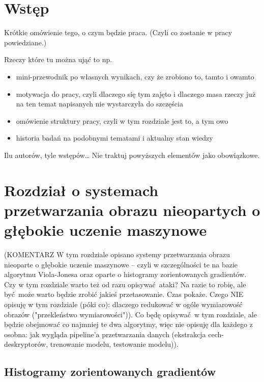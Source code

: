 \documentclass[12pt,a4paper,leqno,oneside,titlepage]{book}
\begin{document}
\mainmatter

\chapter*{Wstęp}

Krótkie omówienie tego, o czym będzie praca. (Czyli co zostanie w pracy powiedziane.)

Rzeczy które tu można ująć to np. 
\begin{itemize}
\item mini-przewodnik po własnych wynikach, czy że zrobiono to, tamto i owamto
\item motywacja do pracy, czyli dlaczego się tym zajęto i dlaczego masa rzeczy już na ten temat napisanych nie wystarczyła do szczęścia
\item omówienie struktury pracy, czyli w tym rozdziale jest to, a tym owo
\item historia badań na podobnymi tematami i aktualny stan wiedzy
\end{itemize}

Ilu autorów, tyle wstępów\ldots{} Nie traktuj powyższych elementów jako obowiązkowe.

\chapter{Rozdział o systemach przetwarzania obrazu nieopartych o głębokie uczenie maszynowe}%

(KOMENTARZ W tym rozdziale opisano systemy przetwarzania obrazu nieoparte o głębokie uczenie maszynowe -- czyli w szczególności te na bazie algorytmu Viola-Jonesa oraz oparte o histogramy zorientowanych gradientów.
Czy w tym rozdziale warto też od razu opisywać ataki? Na razie to robię, ale być może warto będzie zrobić jakieś przetasowanie. Czas pokaże.
Czego NIE opisuję w tym rozdziale (póki co): dlaczego redukować w ogóle wymiarowość obrazów ("przekleństwo wymiarowości")).
Co będę opisywać w tym rozdziale, ale będzie obejmować co najmniej te dwa algorytmy, więc nie opisuję dla każdego z osobna: jak wygląda pipeline'a przetwarzania danych (ekstrakcja cech-deskryptorów, trenowanie modelu, testowanie modelu)).

\section{Histogramy zorientowanych gradientów}
\end{document}
